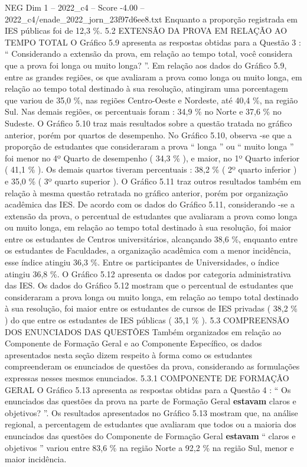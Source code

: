 \begin{textsample}{NEG Dim 1 – 2022\_c4 – Score -4.00 – 2022\_c4/enade\_2022\_jorn\_23f97d6ee8.txt}
Enquanto a proporção registrada em IES públicas foi de 12,3 \%. 5.2 EXTENSÃO DA PROVA EM RELAÇÃO AO TEMPO TOTAL O Gráfico 5.9 apresenta as respostas obtidas para a Questão 3 : “ Considerando a extensão da prova, em relação ao tempo total, você considera que a prova foi longa ou muito longa? ”.
Em relação aos dados do Gráfico 5.9, entre as grandes regiões, os que avaliaram a prova como longa ou muito longa, em relação ao tempo total destinado à sua resolução, atingiram uma porcentagem que variou de 35,0 \%, nas regiões Centro-Oeste e Nordeste, até 40,4 \%, na região Sul.
Nas demais regiões, os percentuais foram : 34,9 \% no Norte e 37,6 \% no Sudeste.
O Gráfico 5.10 traz mais resultados sobre a questão tratada no gráfico anterior, porém por quartos de desempenho.
No Gráfico 5.10, observa -se que a proporção de estudantes que consideraram a prova “ longa ” ou “ muito longa ” foi menor no 4º Quarto de desempenho ( 34,3 \% ), e maior, no 1º Quarto inferior ( 41,1 \% ).
Os demais quartos tiveram percentuais : 38,2 \% ( 2º quarto inferior ) e 35,0 \% ( 3º quarto superior ).
O Gráfico 5.11 traz outros resultados também em relação à mesma questão retratada no gráfico anterior, porém por organização acadêmica das IES.
De acordo com os dados do Gráfico 5.11, considerando -se a extensão da prova, o percentual de estudantes que avaliaram a prova como longa ou muito longa, em relação ao tempo total destinado à sua resolução, foi maior entre os estudantes de Centros universitários, alcançando 38,6 \%, enquanto entre os estudantes de Faculdades, a organização acadêmica com a menor incidência, esse índice atingiu 36,3 \%.
Entre os participantes de Universidades, o índice atingiu 36,8 \%.
O Gráfico 5.12 apresenta os dados por categoria administrativa das IES.
Os dados do Gráfico 5.12 mostram que o percentual de estudantes que consideraram a prova longa ou muito longa, em relação ao tempo total destinado à sua resolução, foi maior entre os estudantes de cursos de IES privadas ( 38,2 \% ) do que entre os estudantes de IES públicas ( 35,1 \% ). 5.3 COMPREENSÃO DOS ENUNCIADOS DAS QUESTÕES Também organizados em relação ao Componente de Formação Geral e ao Componente Específico, os dados apresentados nesta seção dizem respeito à forma como os estudantes compreenderam os enunciados de questões da prova, considerando as formulações expressas nesses mesmos enunciados. 5.3.1 COMPONENTE DE FORMAÇÃO GERAL O Gráfico 5.13 apresenta as respostas obtidas para a Questão 4 : “ Os enunciados das questões da prova na parte de Formação Geral \textbf{estavam} claros e objetivos? ”.
Os resultados apresentados no Gráfico 5.13 mostram que, na análise regional, a percentagem de estudantes que avaliaram que todos ou a maioria dos enunciados das questões do Componente de Formação Geral \textbf{estavam} “ claros e objetivos ” variou entre 83,6 \% na região Norte a 92,2 \% na região Sul, menor e maior incidência.

\end{textsample}
